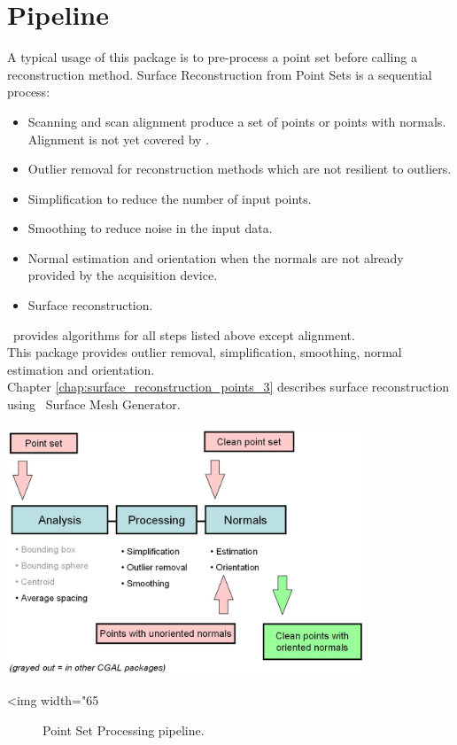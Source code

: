 \section{Pipeline}

A typical usage of this package is to pre-process a point set before calling a reconstruction method.
Surface Reconstruction from Point Sets is a sequential process:

\begin{itemize}
\item Scanning and scan alignment produce a set of points
      or points with normals. Alignment is not yet
      covered by \cgal.
\item Outlier removal for reconstruction methods which
      are not resilient to outliers.
\item Simplification to reduce the number of input points.
\item Smoothing to reduce noise in the input data.
\item Normal estimation and orientation when the normals
      are not already provided by the acquisition device.
\item Surface reconstruction.
\end{itemize}

\cgal\ provides algorithms for all steps listed above except alignment.\\
This package provides outlier removal, simplification, smoothing,
normal estimation and orientation.\\
Chapter  \ref{chap:surface_reconstruction_points_3} describes surface reconstruction using \cgal\ Surface Mesh Generator.

\begin{center}
    \label{Point_set_processing_3-fig-pipeline}
    \begin{ccTexOnly}
        \includegraphics[width=0.8\textwidth]{Point_set_processing_3/pipeline} %
    \end{ccTexOnly}
    \begin{ccHtmlOnly}
        <img width="65%
    \end{ccHtmlOnly}
    \begin{figure}[h]
        \caption{Point Set Processing pipeline.}
    \end{figure}
\end{center}


